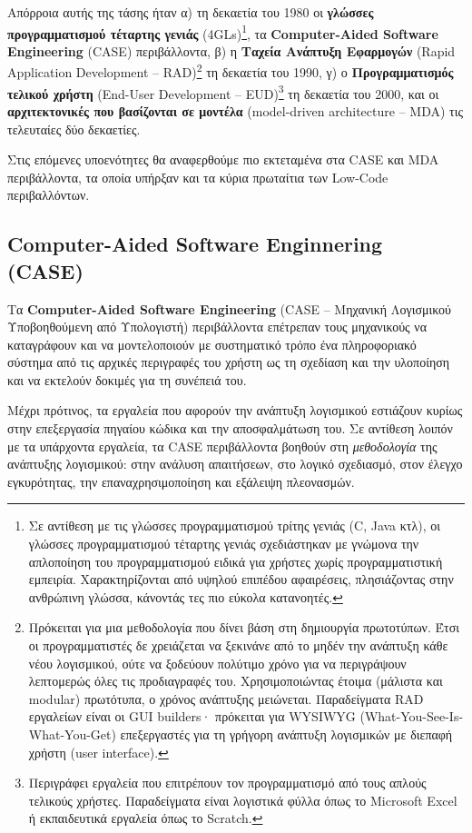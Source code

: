         Απόρροια αυτής της τάσης ήταν α) τη δεκαετία του 1980 οι \textbf{γλώσσες προγραμματισμού τέταρτης γενιάς} (4GLs)\footnote{Σε αντίθεση με τις γλώσσες προγραμματισμού τρίτης γενιάς (C, Java κτλ), οι γλώσσες προγραμματισμού τέταρτης γενιάς σχεδιάστηκαν με γνώμονα την απλοποίηση του προγραμματισμού ειδικά για χρήστες χωρίς προγραμματιστική εμπειρία. Χαρακτηρίζονται από υψηλού επιπέδου αφαιρέσεις, πλησιάζοντας στην ανθρώπινη γλώσσα, κάνοντάς τες πιο εύκολα κατανοητές.}, τα \textbf{Computer-Aided Software Engineering} (CASE) περιβάλλοντα, β) η \textbf{Ταχεία Ανάπτυξη Εφαρμογών} (Rapid Application Development -- RAD)\footnote{Πρόκειται για μια μεθοδολογία που δίνει βάση στη δημιουργία πρωτοτύπων. Έτσι οι προγραμματιστές δε χρειάζεται να ξεκινάνε από το μηδέν την ανάπτυξη κάθε νέου λογισμικού, ούτε να ξοδεύουν πολύτιμο χρόνο για να περιγράψουν λεπτομερώς όλες τις προδιαγραφές του. Χρησιμοποιώντας έτοιμα (μάλιστα και modular) πρωτότυπα, ο χρόνος ανάπτυξης μειώνεται. Παραδείγματα RAD εργαλείων είναι οι GUI builders· πρόκειται για WYSIWYG (What-You-See-Is-What-You-Get) επεξεργαστές για τη γρήγορη ανάπτυξη λογισμικών με διεπαφή χρήστη (user interface).} τη δεκαετία του 1990, γ) ο \textbf{Προγραμματισμός τελικού χρήστη} (End-User Development -- EUD)\footnote{Περιγράφει εργαλεία που επιτρέπουν τον προγραμματισμό από τους απλούς τελικούς χρήστες. Παραδείγματα είναι λογιστικά φύλλα όπως το Microsoft Excel ή εκπαιδευτικά εργαλεία όπως το Scratch.} τη δεκαετία του 2000, και οι \textbf{αρχιτεκτονικές που βασίζονται σε μοντέλα} (model-driven architecture -- MDA) τις τελευταίες δύο δεκαετίες. \cite{Case1985, CASEChikofsky, MDELow}

        Στις επόμενες υποενότητες θα αναφερθούμε πιο εκτεταμένα στα CASE και MDA περιβάλλοντα, τα οποία υπήρξαν και τα κύρια πρωταίτια των Low-Code περιβαλλόντων.

        \subsection{Computer-Aided Software Enginnering (CASE)}
            Τα \textbf{Computer-Aided Software Engineering} (CASE -- Μηχανική Λογισμικού Υποβοηθούμενη από Υπολογιστή) περιβάλλοντα επέτρεπαν τους μηχανικούς να καταγράφουν και να μοντελοποιούν με συστηματικό τρόπο ένα πληροφοριακό σύστημα από τις αρχικές περιγραφές του χρήστη ως τη σχεδίαση και την υλοποίηση και να εκτελούν δοκιμές για τη συνέπειά του.

            Μέχρι πρότινος, τα εργαλεία που αφορούν την ανάπτυξη λογισμικού εστιάζουν κυρίως στην επεξεργασία πηγαίου κώδικα και την αποσφαλμάτωση του. Σε αντίθεση λοιπόν με τα υπάρχοντα εργαλεία, τα CASE περιβάλλοντα βοηθούν στη \textit{μεθοδολογία} της ανάπτυξης λογισμικού: στην ανάλυση απαιτήσεων, στο λογικό σχεδιασμό, στον έλεγχο εγκυρότητας, την επαναχρησιμοποίηση και εξάλειψη πλεονασμών.

